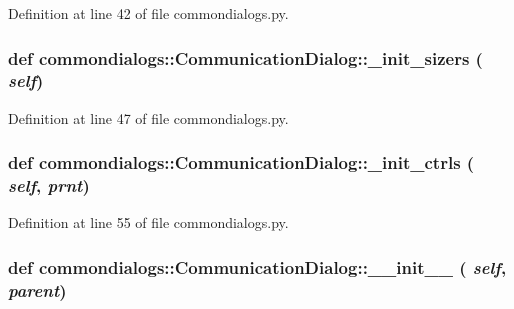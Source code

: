 Definition at line 42 of file commondialogs.py.\hypertarget{classcommondialogs_1_1CommunicationDialog_7273c6e406e4e14b27a7a4067f86ecff}{
\subsubsection[\_\-init\_\-sizers]{\setlength{\rightskip}{0pt plus 5cm}def commondialogs::Communication\-Dialog::\_\-init\_\-sizers ( {\em self})}}
\label{classcommondialogs_1_1CommunicationDialog_7273c6e406e4e14b27a7a4067f86ecff}




Definition at line 47 of file commondialogs.py.\hypertarget{classcommondialogs_1_1CommunicationDialog_80e062462e3b696373dfd4debc1a2d67}{
\subsubsection[\_\-init\_\-ctrls]{\setlength{\rightskip}{0pt plus 5cm}def commondialogs::Communication\-Dialog::\_\-init\_\-ctrls ( {\em self},  {\em prnt})}}
\label{classcommondialogs_1_1CommunicationDialog_80e062462e3b696373dfd4debc1a2d67}




Definition at line 55 of file commondialogs.py.\hypertarget{classcommondialogs_1_1CommunicationDialog_ee020ad81cb3ea6df76d34785bf56a36}{
\subsubsection[\_\-\_\-init\_\-\_\-]{\setlength{\rightskip}{0pt plus 5cm}def commondialogs::Communication\-Dialog::\_\-\_\-init\_\-\_\- ( {\em self},  {\em parent})}}
\label{classcommondialogs_1_1CommunicationDialog_ee020ad81cb3ea6df76d34785bf56a36}




